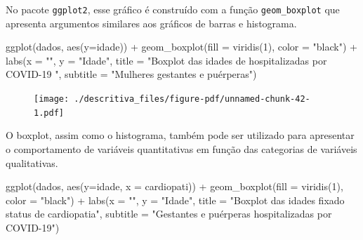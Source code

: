 \documentclass[
  letterpaper,
  DIV=11,
  numbers=noendperiod]{scrreprt}
\newenvironment{Shaded}{\begin{snugshade}}{\end{snugshade}}
\newcommand{\AttributeTok}[1]{\textcolor[rgb]{0.40,0.45,0.13}{#1}}
\newcommand{\DecValTok}[1]{\textcolor[rgb]{0.68,0.00,0.00}{#1}}
\newcommand{\FunctionTok}[1]{\textcolor[rgb]{0.28,0.35,0.67}{#1}}
\newcommand{\NormalTok}[1]{\textcolor[rgb]{0.00,0.23,0.31}{#1}}
\newcommand{\SpecialCharTok}[1]{\textcolor[rgb]{0.37,0.37,0.37}{#1}}
\newcommand{\StringTok}[1]{\textcolor[rgb]{0.13,0.47,0.30}{#1}}
\begin{document}
No pacote \texttt{ggplot2}, esse gráfico é construído com a função
\texttt{geom\_boxplot} que apresenta argumentos similares aos gráficos
de barras e histograma.

\begin{Shaded}
\begin{Highlighting}[]
\FunctionTok{ggplot}\NormalTok{(dados, }\FunctionTok{aes}\NormalTok{(}\AttributeTok{y=}\NormalTok{idade))  }\SpecialCharTok{+} 
  \FunctionTok{geom\_boxplot}\NormalTok{(}\AttributeTok{fill =} \FunctionTok{viridis}\NormalTok{(}\DecValTok{1}\NormalTok{), }\AttributeTok{color =} \StringTok{"black"}\NormalTok{) }\SpecialCharTok{+}
  \FunctionTok{labs}\NormalTok{(}\AttributeTok{x =} \StringTok{""}\NormalTok{, }\AttributeTok{y =} \StringTok{"Idade"}\NormalTok{, }\AttributeTok{title =} \StringTok{"Boxplot das idades de hospitalizadas por COVID{-}19 "}\NormalTok{, }\AttributeTok{subtitle =} \StringTok{"Mulheres gestantes e puérperas"}\NormalTok{)}
\end{Highlighting}
\end{Shaded}

\begin{figure}[H]

{\centering \texttt{[image: ./descritiva\_files/figure-pdf/unnamed-chunk-42-1.pdf]}

}

\end{figure}

O boxplot, assim como o histograma, também pode ser utilizado para
apresentar o comportamento de variáveis quantitativas em função das
categorias de variáveis qualitativas.

\begin{Shaded}
\begin{Highlighting}[]
\FunctionTok{ggplot}\NormalTok{(dados, }\FunctionTok{aes}\NormalTok{(}\AttributeTok{y=}\NormalTok{idade, }\AttributeTok{x =}\NormalTok{ cardiopati))  }\SpecialCharTok{+} 
  \FunctionTok{geom\_boxplot}\NormalTok{(}\AttributeTok{fill =} \FunctionTok{viridis}\NormalTok{(}\DecValTok{1}\NormalTok{), }\AttributeTok{color =} \StringTok{"black"}\NormalTok{) }\SpecialCharTok{+}
  \FunctionTok{labs}\NormalTok{(}\AttributeTok{x =} \StringTok{""}\NormalTok{, }\AttributeTok{y =} \StringTok{"Idade"}\NormalTok{, }\AttributeTok{title =} \StringTok{"Boxplot das idades fixado status de cardiopatia"}\NormalTok{, }\AttributeTok{subtitle =} \StringTok{"Gestantes e puérperas hospitalizadas por COVID{-}19"}\NormalTok{)}
\end{Highlighting}
\end{Shaded}
\end{document}
